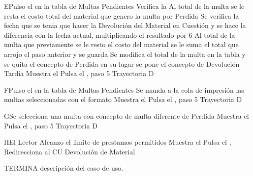 		\begin{UCtrayectoriaA}{E}{Pulso el  en la tabla de Multas Pendientes}
			\UCpaso[\UCsist] Verifica la 
			\UCpaso[\UCsist] Al total de la multa se le resta el costo total del material que genero la multa por Perdida
			\UCpaso[\UCsist] Se verifica la fecha que se tenia que hacer la Devolución del Material en Cuestión y se hace la diferencia con la fecha actual, multiplicando el resultado por 6
			\UCpaso[\UCsist] Al total de la multa que previamente se le resto el costo del material se le suma el total que arrojo el paso anterior y se guarda
			\UCpaso[\UCsist] Se modifica el total de la multa en la tabla y se quita el concepto de Perdida en su lugar se pone el concepto de Devolución Tardía
			\UCpaso[\UCsist] Muestra el 
			\UCpaso[\UCactor] Pulsa el , paso 5 Trayectoria D
		\end{UCtrayectoriaA}
		\begin{UCtrayectoriaA}{F}{Pulso el  en la tabla de Multas Pendientes}
			\UCpaso[\UCsist] Se manda a la cola de impresión las multas seleccionadas con el formato 
			\UCpaso[\UCsist] Muestra el 
			\UCpaso[\UCactor] Pulsa el , paso 5 Trayectoria D
		\end{UCtrayectoriaA}
		\begin{UCtrayectoriaA}{G}{Se selecciona una multa con concepto de multa diferente de Perdida}
			\UCpaso[\UCsist] Muestra el 
			\UCpaso[\UCactor] Pulsa el , paso 5 Trayectoria D
		\end{UCtrayectoriaA}
		\begin{UCtrayectoriaA}{H}{El Lector Alcanzo el limite de prestamos permitidos}
			\UCpaso[\UCsist] Muestra el 
			\UCpaso[\UCactor] Pulsa el , Redirecciona al CU Devolución de Material
		\end{UCtrayectoriaA}
		
TERMINA descripción del caso de uso.